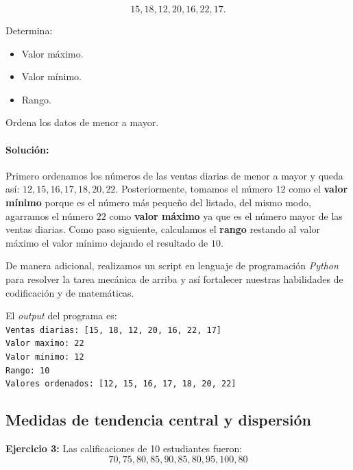 \documentclass[12pt]{article}
\begin{document}
\[15, 18, 12, 20, 16, 22, 17.\]

Determina:
\begin{itemize}
    \item [] Valor máximo.
    \item [] Valor mínimo.
    \item [] Rango.
\end{itemize}

Ordena los datos de menor a mayor.

\paragraph{\textbf{Solución: }}

Primero ordenamos los números de las ventas diarias de menor a mayor y queda así: $12, 15, 16, 17, 18, 20, 22$. Posteriormente, tomamos el número $12$ como el \textbf{valor mínimo} porque es el número más pequeño del listado, del mismo modo, agarramos el número $22$ como \textbf{valor máximo} ya que es el número mayor de las ventas diarias. Como paso siguiente, calculamos el \textbf{rango} restando al valor máximo el valor mínimo dejando el resultado de $10$.

De manera adicional, realizamos un script en lenguaje de programación \textit{Python} para resolver la tarea mecánica de arriba y así fortalecer nuestras habilidades de codificación y de matemáticas.


El \textit{output} del programa es: \\
    
    \indent \verb|Ventas diarias: [15, 18, 12, 20, 16, 22, 17]| \\
    \indent \verb|Valor maximo: 22| \\
    \indent \verb|Valor minimo: 12| \\
    \indent \verb|Rango: 10| \\
    \indent \verb|Valores ordenados: [12, 15, 16, 17, 18, 20, 22]| \\


\subsection*{\centering Medidas de tendencia central y dispersión}
\textbf{Ejercicio 3:} Las calificaciones de 10 estudiantes fueron:
\[70, 75, 80, 85, 90, 85, 80, 95, 100, 80\]
\end{document}
